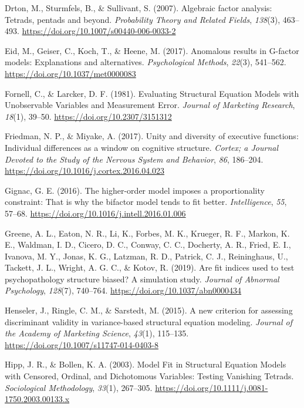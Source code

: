 \documentclass[
  american,
  man,floatsintext]{apa7}
\newlength{\cslhangindent}
\newenvironment{CSLReferences}[2] %
 {\begin{list}{}{%
  \setlength{\itemindent}{0pt}
  \setlength{\leftmargin}{0pt}
  \setlength{\parsep}{0pt}
  \ifodd #1
   \setlength{\leftmargin}{\cslhangindent}
   \setlength{\itemindent}{-1\cslhangindent}
  \fi
  \setlength{\itemsep}{#2\baselineskip}}}
 {\end{list}}
\begin{document}
\begin{CSLReferences}{1}{0}
Drton, M., Sturmfels, B., \& Sullivant, S. (2007). Algebraic factor analysis: Tetrads, pentads and beyond. \emph{Probability Theory and Related Fields}, \emph{138}(3), 463--493. \url{https://doi.org/10.1007/s00440-006-0033-2}

Eid, M., Geiser, C., Koch, T., \& Heene, M. (2017). Anomalous results in {G-factor} models: {Explanations} and alternatives. \emph{Psychological Methods}, \emph{22}(3), 541--562. \url{https://doi.org/10.1037/met0000083}

Fornell, C., \& Larcker, D. F. (1981). Evaluating {Structural Equation Models} with {Unobservable Variables} and {Measurement Error}. \emph{Journal of Marketing Research}, \emph{18}(1), 39--50. \url{https://doi.org/10.2307/3151312}

Friedman, N. P., \& Miyake, A. (2017). Unity and diversity of executive functions: {Individual} differences as a window on cognitive structure. \emph{Cortex; a Journal Devoted to the Study of the Nervous System and Behavior}, \emph{86}, 186--204. \url{https://doi.org/10.1016/j.cortex.2016.04.023}

Gignac, G. E. (2016). The higher-order model imposes a proportionality constraint: {That} is why the bifactor model tends to fit better. \emph{Intelligence}, \emph{55}, 57--68. \url{https://doi.org/10.1016/j.intell.2016.01.006}

Greene, A. L., Eaton, N. R., Li, K., Forbes, M. K., Krueger, R. F., Markon, K. E., Waldman, I. D., Cicero, D. C., Conway, C. C., Docherty, A. R., Fried, E. I., Ivanova, M. Y., Jonas, K. G., Latzman, R. D., Patrick, C. J., Reininghaus, U., Tackett, J. L., Wright, A. G. C., \& Kotov, R. (2019). Are fit indices used to test psychopathology structure biased? {A} simulation study. \emph{Journal of Abnormal Psychology}, \emph{128}(7), 740--764. \url{https://doi.org/10.1037/abn0000434}

Henseler, J., Ringle, C. M., \& Sarstedt, M. (2015). A new criterion for assessing discriminant validity in variance-based structural equation modeling. \emph{Journal of the Academy of Marketing Science}, \emph{43}(1), 115--135. \url{https://doi.org/10.1007/s11747-014-0403-8}

Hipp, J. R., \& Bollen, K. A. (2003). Model {Fit} in {Structural Equation Models} with {Censored}, {Ordinal}, and {Dichotomous Variables}: {Testing Vanishing Tetrads}. \emph{Sociological Methodology}, \emph{33}(1), 267--305. \url{https://doi.org/10.1111/j.0081-1750.2003.00133.x}


\end{CSLReferences}
\end{document}
